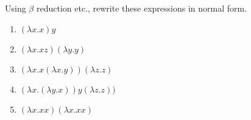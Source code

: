 \documentclass{article}
\begin{document}
\begin{Exercise}
Using $\beta$ reduction etc., rewrite these expressions in normal form.
\begin{enumerate}
\item $(\lambda x.x) y$
\item $(\lambda x.x z) (\lambda y.y)$
\item $(\lambda x.x (\lambda x.y)) (\lambda z.z)$
\item $(\lambda x.(\lambda y.x)) y (\lambda z.z))$
\item $(\lambda x.x x) (\lambda x.x x)$
\end{enumerate}
\end{Exercise}
\end{document}

